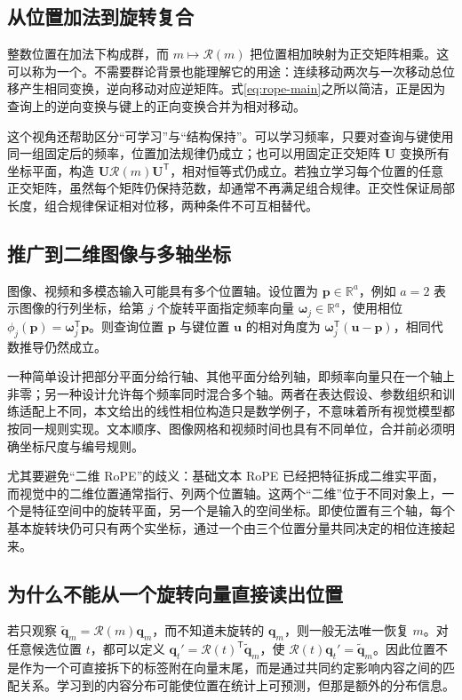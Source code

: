 \documentclass[UTF8,12pt,a4paper,fontset=fandol]{ctexart}
\begin{document}
\subsection{从位置加法到旋转复合}
整数位置在加法下构成群，而 $m\mapsto\mathcal R(m)$ 把位置相加映射为正交矩阵相乘。这可以称为一个。不需要群论背景也能理解它的用途：连续移动两次与一次移动总位移产生相同变换，逆向移动对应逆矩阵。式\eqref{eq:rope-main}之所以简洁，正是因为查询上的逆向变换与键上的正向变换合并为相对移动。

这个视角还帮助区分“可学习”与“结构保持”。可以学习频率，只要对查询与键使用同一组固定后的频率，位置加法规律仍成立；也可以用固定正交矩阵 $\mathbf U$ 变换所有坐标平面，构造 $\mathbf U\mathcal R(m)\mathbf U^{\mathsf T}$，相对恒等式仍成立。若独立学习每个位置的任意正交矩阵，虽然每个矩阵仍保持范数，却通常不再满足组合规律。正交性保证局部长度，组合规律保证相对位移，两种条件不可互相替代。

\subsection{推广到二维图像与多轴坐标}
图像、视频和多模态输入可能具有多个位置轴。设位置为 $\mathbf p\in\mathbb R^a$，例如 $a=2$ 表示图像的行列坐标，给第 $j$ 个旋转平面指定频率向量 $\boldsymbol\omega_j\in\mathbb R^a$，使用相位 $\phi_j(\mathbf p)=\boldsymbol\omega_j^{\mathsf T}\mathbf p$。则查询位置 $\mathbf p$ 与键位置 $\mathbf u$ 的相对角度为 $\boldsymbol\omega_j^{\mathsf T}(\mathbf u-\mathbf p)$，相同代数推导仍然成立。

一种简单设计把部分平面分给行轴、其他平面分给列轴，即频率向量只在一个轴上非零；另一种设计允许每个频率同时混合多个轴。两者在表达假设、参数组织和训练适配上不同，本文给出的线性相位构造只是数学例子，不意味着所有视觉模型都按同一规则实现。文本顺序、图像网格和视频时间也具有不同单位，合并前必须明确坐标尺度与编号规则。

尤其要避免“二维 RoPE”的歧义：基础文本 RoPE 已经把特征拆成二维实平面，而视觉中的二维位置通常指行、列两个位置轴。这两个“二维”位于不同对象上，一个是特征空间中的旋转平面，另一个是输入的空间坐标。即使位置有三个轴，每个基本旋转块仍可只有两个实坐标，通过一个由三个位置分量共同决定的相位连接起来。

\subsection{为什么不能从一个旋转向量直接读出位置}
若只观察 $\widetilde{\mathbf q}_m=\mathcal R(m)\mathbf q_m$，而不知道未旋转的 $\mathbf q_m$，则一般无法唯一恢复 $m$。对任意候选位置 $t$，都可以定义 $\mathbf q_t'=\mathcal R(t)^{\mathsf T}\widetilde{\mathbf q}_m$，使 $\mathcal R(t)\mathbf q_t'=\widetilde{\mathbf q}_m$。因此位置不是作为一个可直接拆下的标签附在向量末尾，而是通过共同约定影响内容之间的匹配关系。学习到的内容分布可能使位置在统计上可预测，但那是额外的分布信息。
\end{document}
